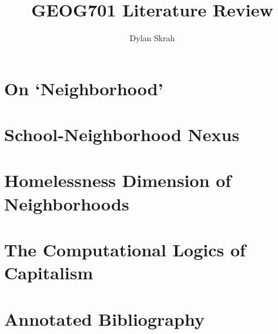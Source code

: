\documentclass[doc,longnamesfirst,sort,round,12pt,natbib]{apa6}
\begin{document}
\title{GEOG701 Literature Review}
\author{Dylan Skrah}
\note{\today}
\maketitle
\tableofcontents
\pagebreak

\section{On `Neighborhood'}


\section{School-Neighborhood Nexus}


\section{Homelessness Dimension of Neighborhoods}


\section{The Computational Logics of Capitalism}

\pagebreak

\section{Annotated Bibliography}



\end{document}
